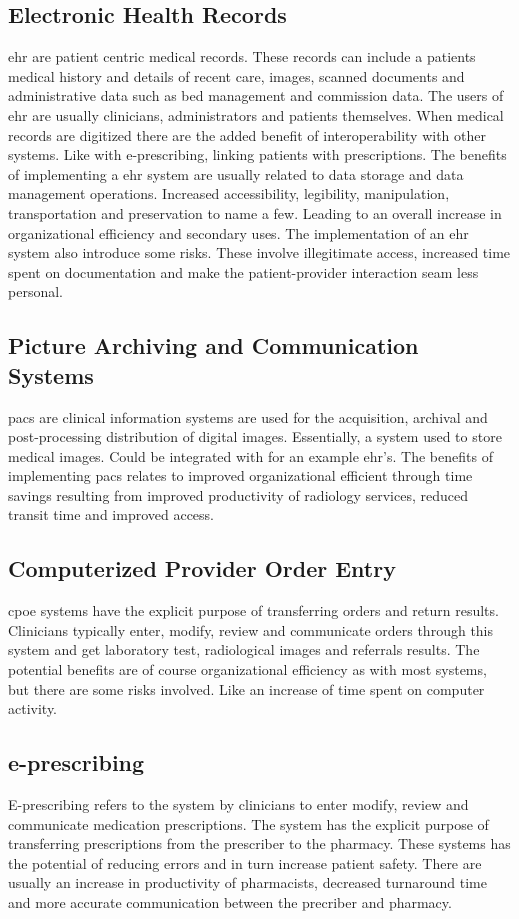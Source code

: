 \subsection{Electronic Health Records}
\gls{ehr} are patient centric medical records. 
These records can include a patients medical history and details of recent care, images, scanned documents and administrative data such as bed management and commission data.
The users of \gls{ehr} are usually clinicians, administrators and patients themselves. 
When medical records are digitized there are the added benefit of interoperability with other systems.
Like with e-prescribing, linking patients with prescriptions. 
The benefits of implementing a \gls{ehr} system are usually related to data storage and data management operations. Increased accessibility, legibility, manipulation, transportation and preservation to name a few. Leading to an overall increase in organizational efficiency and secondary uses. The implementation of an \gls{ehr} system also introduce some risks.
These involve illegitimate access, increased time spent on documentation and make the patient-provider interaction seam less personal.


\subsection{Picture Archiving and Communication Systems}
\gls{pacs} are clinical information systems are used for the acquisition, archival and post-processing distribution of digital images. 
Essentially, a system used to store medical images.
Could be integrated with for an example \gls{ehr}'s.
The benefits of implementing \gls{pacs} relates to improved organizational efficient through time savings resulting from improved productivity of radiology services, reduced transit time and improved access. 

\subsection{Computerized Provider Order Entry}
\gls{cpoe} systems have the explicit purpose of transferring orders and return results.
Clinicians typically enter, modify, review and communicate orders through this system and get laboratory test, radiological images and referrals results. 
The potential benefits are of course organizational efficiency as with most systems, but there are some risks involved. Like an increase of time spent on computer activity.

\subsection{e-prescribing}
E-prescribing refers to the system by clinicians to enter modify, review and communicate medication prescriptions. 
The system has the explicit purpose of transferring prescriptions from the prescriber to the pharmacy.
These systems has the potential of reducing errors and in turn increase patient safety. 
There are usually an increase in productivity of pharmacists, decreased turnaround time and more accurate communication between the precriber and pharmacy. 


